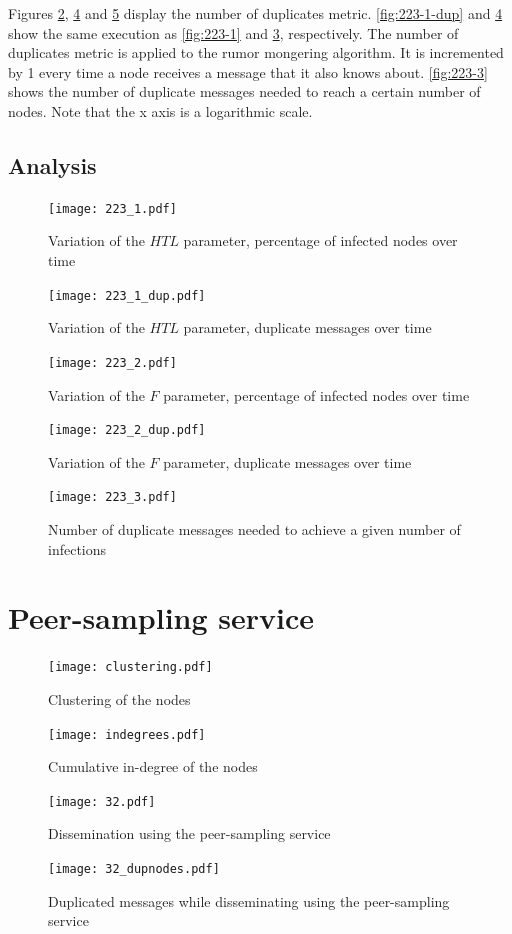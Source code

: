 \documentclass[11pt,a4paper]{scrartcl}
\begin{document}
Figures \ref{fig:223-1-dup}, \ref{fig:223-2-dup} and \ref{fig:223-3} display the number of duplicates metric. \autoref{fig:223-1-dup} and \ref{fig:223-2-dup} show the same execution as \autoref{fig:223-1} and \ref{fig:223-2}, respectively. The number of duplicates metric is applied to the rumor mongering algorithm. It is incremented by 1 every time a node receives a message that it also knows about. \autoref{fig:223-3} shows the number of duplicate messages needed to reach a certain number of nodes. Note that the x axis is a logarithmic scale.

\subsection{Analysis}

\begin{figure}
	\centering
	\texttt{[image: 223\_1.pdf]}
	\caption{Variation of the $HTL$ parameter, percentage of infected nodes over time}
	\label{fig:223-1}
\end{figure}
\begin{figure}
	\centering
	\texttt{[image: 223\_1\_dup.pdf]}
	\caption{Variation of the $HTL$ parameter, duplicate messages over time}
	\label{fig:223-1-dup}
\end{figure}
\begin{figure}
	\centering
	\texttt{[image: 223\_2.pdf]}
	\caption{Variation of the $F$ parameter, percentage of infected nodes over time}
	\label{fig:223-2}
\end{figure}
\begin{figure}
	\centering
	\texttt{[image: 223\_2\_dup.pdf]}
	\caption{Variation of the $F$ parameter, duplicate messages over time}
	\label{fig:223-2-dup}
\end{figure}
\begin{figure}
	\centering
	\texttt{[image: 223\_3.pdf]}
	\caption{Number of duplicate messages needed to achieve a given number of infections}
	\label{fig:223-3}
\end{figure}

\section{Peer-sampling service}



\begin{figure}
	\centering
	\texttt{[image: clustering.pdf]}
	\caption{Clustering of the nodes}
	\label{fig:clustering}
\end{figure}
\begin{figure}
	\centering
	\texttt{[image: indegrees.pdf]}
	\caption{Cumulative in-degree of the nodes}
	\label{fig:indegrees}
\end{figure}

\begin{figure}
	\centering
	\texttt{[image: 32.pdf]}
	\caption{Dissemination using the peer-sampling service}
	\label{fig:32}
\end{figure}
\begin{figure}
	\centering
	\texttt{[image: 32\_dupnodes.pdf]}
	\caption{Duplicated messages while disseminating using the peer-sampling service}
	\label{fig:32-dup}
\end{figure}
\end{document}
